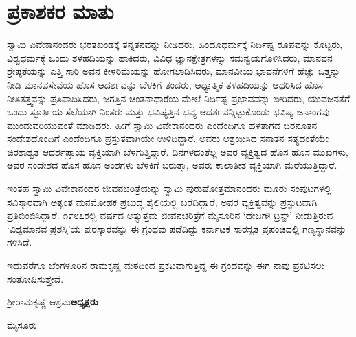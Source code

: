 
\chapter*{ಪ್ರಕಾಶಕರ ಮಾತು}

ಸ್ವಾಮಿ ವಿವೇಕಾನಂದರು ಭರತಖಂಡಕ್ಕೆ ತನ್ನತನವನ್ನು ನೀಡಿದರು, ಹಿಂದೂಧರ್ಮಕ್ಕೆ ನಿರ್ದಿಷ್ಟ ರೂಪವನ್ನು ಕೊಟ್ಟರು, ವಿಶ್ವಧರ್ಮಕ್ಕೆ ಒಂದು ತಳಹದಿಯನ್ನು ಹಾಕಿದರು, ವಿವಿಧ ಜ್ಞಾನಕ್ಷೇತ್ರಗಳನ್ನು ಸಮನ್ವಯಗೊಳಿಸಿದರು, ಮಾನವನ ಶ್ರೇಷ್ಠತೆಯನ್ನು ಎತ್ತಿ ಸಾರಿ ಅವನ ಕೀಳರಿಮೆಯನ್ನು ಹೋಗಲಾಡಿಸಿದರು, ಮಾನವೀಯ ಭಾವನೆಗಳಿಗೆ ಹೆಚ್ಚು ಒತ್ತನ್ನು ನೀಡಿ ಮಾನವಸೇವೆಯ ಹೊಸ ಆದರ್ಶವನ್ನು ಬೆಳಕಿಗೆ ತಂದರು, ಆಧ್ಯಾತ್ಮಿಕ ತಳಹದಿಯನ್ನು ಆಧರಿಸಿದ ಹೊಸ ನೀತಿತತ್ತ್ವವನ್ನು ಪ್ರತಿಪಾದಿಸಿದರು, ಜಗತ್ತಿನ ಚಿಂತನಾಧಾರೆಯ ಮೇಲೆ ನಿರ್ದಿಷ್ಟ ಪ್ರಭಾವವನ್ನು ಬೀರಿದರು, ಯುವಜನತೆಗೆ ಒಂದು ಸ್ಫೂರ್ತಿಯ ಸೆಲೆಯಾಗಿ ನಿಂತರು ಮತ್ತು ಭವಿಷ್ಯತ್ತಿನ ಭವ್ಯ ಆದರ್ಶವನ್ನಿಟ್ಟುಕೊಂಡು ಭವಿಷ್ಯ ಜನಾಂಗವು ಮುಂದುವರಿಯುವಂತೆ ಮಾಡಿದರು. ಹೀಗೆ ಸ್ವಾಮಿ ವಿವೇಕಾನಂದರು ಎಂದೆಂದಿಗೂ ಹಳತಾಗದ ಚಿರನೂತನ ಸಂದೇಶದೊಂದಿಗೆ ಎಂದೆಂದಿಗೂ ಪ್ರಸ್ತುತವಾಗಿಯೇ ಉಳಿದಿದ್ದಾರೆ. ಅವರು ಆಶ್ರಯಿಸಿದ ಸನಾತನ ಸತ್ಯದಂತೆಯೇ ಚಿರಶಾಶ್ವತ ಆದರ್ಶಪ್ರಾಯ ವ್ಯಕ್ತಿಯಾಗಿ ಬೆಳಗುತ್ತಿದ್ದಾರೆ. ದಿನಗಳದಂತೆಲ್ಲ ಅವರ ವ್ಯಕ್ತಿತ್ವದ ಹೊಸ ಹೊಸ ಮುಖಗಳು, ಅವರ ಸಂದೇಶದ ಹೊಸ ಹೊಸ ಅಂಶಗಳು ಬೆಳಕಿಗೆ ಬರುತ್ತಾ, ಅವರು ಕಾಲಾತೀತ ವ್ಯಕ್ತಿಯಾಗಿ ಮೆರೆಯುತ್ತಿದ್ದಾರೆ.

ಇಂತಹ ಸ್ವಾಮಿ ವಿವೇಕಾನಂದರ ಜೀವನಚರಿತ್ರೆಯನ್ನು ಸ್ವಾಮಿ ಪುರುಷೋತ್ತಮಾನಂದರು ಮೂರು ಸಂಪುಟಗಳಲ್ಲಿ ಸವಿಸ್ತಾರವಾಗಿ ಅತ್ಯಂತ ಮನಮೋಹಕ ಪ್ರಬುದ್ಧ ಶೈಲಿಯಲ್ಲಿ ಬರೆದಿದ್ದಾರೆ, ಅವರ ವ್ಯಕ್ತಿತ್ವವನ್ನು ಪ್ರಸ್ಫುಟವಾಗಿ ಪ್ರತಿಬಿಂಬಿಸಿದ್ದಾರೆ. ೧೯೮೭ರಲ್ಲಿ ವರ್ಷದ ಅತ್ಯುತ್ತಮ ಜೀವನಚರಿತ್ರೆಗೆ ಮೈಸೂರಿನ ‘ದೇಜಗೌ ಟ್ರಸ್ಟ್’ ನೀಡುತ್ತಿರುವ ‘ವಿಶ್ವಮಾನವ ಪ್ರಶಸ್ತಿ’ಯ ಪುರಸ್ಕಾರವನ್ನು ಈ ಗ್ರಂಥವು ಪಡೆದಿದ್ದು ಕರ್ನಾಟಕ ಸಾರಸ್ವತ ಪ್ರಪಂಚದಲ್ಲಿ ಗಣ್ಯಸ್ಥಾನವನ್ನು ಗಳಿಸಿದೆ.

ಇದುವರೆಗೂ ಬೆಂಗಳೂರಿನ ರಾಮಕೃಷ್ಣ ಮಠದಿಂದ ಪ್ರಕಟವಾಗುತ್ತಿದ್ದ ಈ ಗ್ರಂಥವನ್ನು ಈಗ ನಾವು ಪ್ರಕಟಿಸಲು ಸಂತೋಷಿಸುತ್ತೇವೆ.

\bigskip

\noindent
ಶ್ರೀರಾಮಕೃಷ್ಣ ಆಶ್ರಮ\hfill\textbf{ಅಧ್ಯಕ್ಷರು}

\begin{flushleft}
ಮೈಸೂರು
\end{flushleft}

